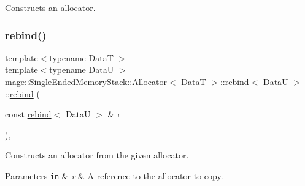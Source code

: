 Constructs an allocator. \hypertarget{structmage_1_1_single_ended_memory_stack_1_1_allocator_1_1rebind_a35f57e484c52757b1bc93ff04bbce813}{}\label{structmage_1_1_single_ended_memory_stack_1_1_allocator_1_1rebind_a35f57e484c52757b1bc93ff04bbce813} 
\subsubsection{\texorpdfstring{rebind()}{rebind()}\hspace{0.1cm}{\footnotesize\ttfamily [2/3]}}
{\footnotesize\ttfamily template$<$typename DataT $>$ \\
template$<$typename DataU $>$ \\
\hyperlink{structmage_1_1_single_ended_memory_stack_1_1_allocator}{mage\+::\+Single\+Ended\+Memory\+Stack\+::\+Allocator}$<$ DataT $>$\+::\hyperlink{structmage_1_1_single_ended_memory_stack_1_1_allocator_1_1rebind}{rebind}$<$ DataU $>$\+::\hyperlink{structmage_1_1_single_ended_memory_stack_1_1_allocator_1_1rebind}{rebind} (\begin{DoxyParamCaption}\item[{const \hyperlink{structmage_1_1_single_ended_memory_stack_1_1_allocator_1_1rebind}{rebind}$<$ DataU $>$ \&}]{r }\end{DoxyParamCaption})\hspace{0.3cm}{\ttfamily [private]}, {\ttfamily [delete]}}

Constructs an allocator from the given allocator.


\begin{DoxyParams}[1]{Parameters}
\mbox{\tt in}  & {\em r} & A reference to the allocator to copy. \\
\hline
\end{DoxyParams}
\hypertarget{structmage_1_1_single_ended_memory_stack_1_1_allocator_1_1rebind_ad378b1bdb6fac89d6d8df68ea66d12da}{}\label{structmage_1_1_single_ended_memory_stack_1_1_allocator_1_1rebind_ad378b1bdb6fac89d6d8df68ea66d12da} 
